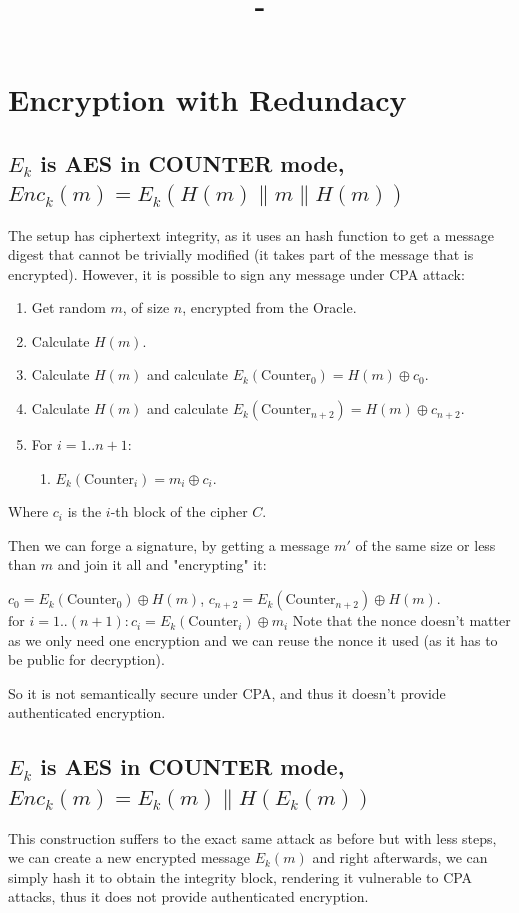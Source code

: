 \documentclass{article}
\date{}
\title{\textit{\course} - \labName}
\author{\me}
\begin{document}
\maketitle
\section{Encryption with Redundacy}

\subsection{$E_k$ is AES in COUNTER mode, $Enc_k(m) = E_k(H(m) \| m \| H(m))$}
The setup has ciphertext integrity, as it uses an hash function to get a message digest that cannot be trivially modified (it takes part of the message that is encrypted). However, it is possible to sign any message under CPA attack:
\begin{enumerate}
    \item Get random $m$, of size $n$, encrypted from the Oracle.
    \item Calculate $H(m)$.
    \item Calculate $H(m)$ and calculate $E_k(\text{Counter}_0) = H(m) \oplus c_{0}$.
    \item Calculate $H(m)$ and calculate $E_k(\text{Counter}_{n+2}) = H(m) \oplus c_{n+2}$.
    \item For $i=1..n+1$: \begin{enumerate}
        \item $E_k(\text{Counter}_i) = m_i \oplus c_i$.
    \end{enumerate}
\end{enumerate}
Where $c_i$ is the $i$-th block of the cipher $C$.

Then we can forge a signature, by getting a message $m'$ of the same size or less than $m$ and join it all and "encrypting" it:

$c_0 = E_k(\text{Counter}_0) \oplus H(m)$, $c_{n+2} = E_k(\text{Counter}_{n+2}) \oplus H(m)$. \\
$
\text{for } i=1..(n+1):
    c_i = E_k(\text{Counter}_i) \oplus m_i
$
Note that the nonce doesn't matter as we only need one encryption and we can reuse the nonce it used (as it has to be public for decryption).
    
So it is not semantically secure under CPA, and thus it doesn't provide authenticated encryption.

\subsection{$E_k$ is AES in COUNTER mode, $Enc_k(m) = E_k(m) \| H(E_k(m))$}
This construction suffers to the exact same attack as before but with less steps, we can create a new encrypted message $E_k(m)$ and right afterwards, we can simply hash it to obtain the integrity block, rendering it vulnerable to CPA attacks, thus it does not provide authenticated encryption.
\end{document}
